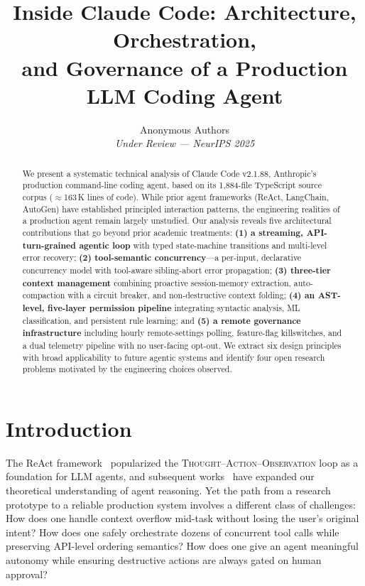 \documentclass{article}
\title{%
  \textbf{Inside Claude Code: Architecture, Orchestration,}\\
  \textbf{and Governance of a Production LLM Coding Agent}
}
\author{%
  Anonymous Authors\\
  \textit{Under Review --- NeurIPS 2025}
}
\begin{document}
\maketitle

\begin{abstract}
We present a systematic technical analysis of Claude Code v2.1.88, Anthropic's production command-line coding agent, based on its 1,884-file TypeScript source corpus ($\approx$163\,K lines of code). While prior agent frameworks (ReAct, LangChain, AutoGen) have established principled interaction patterns, the engineering realities of a production agent remain largely unstudied. Our analysis reveals five architectural contributions that go beyond prior academic treatments: \textbf{(1) a streaming, API-turn-grained agentic loop} with typed state-machine transitions and multi-level error recovery; \textbf{(2) tool-semantic concurrency}---a per-input, declarative concurrency model with tool-aware sibling-abort error propagation; \textbf{(3) three-tier context management} combining proactive session-memory extraction, auto-compaction with a circuit breaker, and non-destructive context folding; \textbf{(4) an AST-level, five-layer permission pipeline} integrating syntactic analysis, ML classification, and persistent rule learning; and \textbf{(5) a remote governance infrastructure} including hourly remote-settings polling, feature-flag killswitches, and a dual telemetry pipeline with no user-facing opt-out. We extract six design principles with broad applicability to future agentic systems and identify four open research problems motivated by the engineering choices observed.
\end{abstract}

\section{Introduction}

The ReAct framework~\cite{yao2022react} popularized the \textsc{Thought--Action--Observation} loop as a foundation for LLM agents, and subsequent works~\cite{shinn2023reflexion,wei2022chain,schick2023toolformer} have expanded our theoretical understanding of agent reasoning. Yet the path from a research prototype to a reliable production system involves a different class of challenges: How does one handle context overflow mid-task without losing the user's original intent? How does one safely orchestrate dozens of concurrent tool calls while preserving API-level ordering semantics? How does one give an agent meaningful autonomy while ensuring destructive actions are always gated on human approval?
\end{document}
